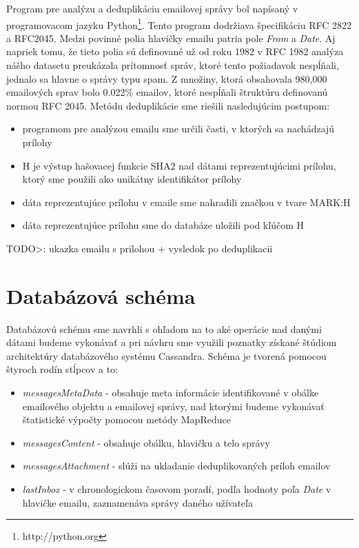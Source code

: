 \documentclass[11pt,twoside,a4paper]{book}
\begin{document}
Program pre analýzu a deduplikáciu emailovej správy bol napísaný v programovacom jazyku Python\footnote{http://python.org}. Tento program dodržiava špecifikáciu RFC 2822 a RFC2045. 
Medzi povinné polia hlavičky emailu patria pole \emph{From} a \emph{Date}. Aj napriek tomu, že tieto polia sú definované už od roku 1982 v RFC 1982 analýza nášho datasetu preukázala prítomnosť správ, ktoré tento požiadavok nespĺňali, jednalo sa hlavne o správy typu spam. Z množiny, ktorá obsahovala 980,000 emailových sprav bolo 0.022\% emailov, ktoré nespĺňali štruktúru definovanú normou RFC 2045. Metódu deduplikácie sme riešili nasledujúcim postupom:

\begin{itemize}
 \item programom pre analýzou emailu sme určili časti, v ktorých sa nachádzajú prílohy
 \item H je výstup hašovacej funkcie SHA2 nad dátami reprezentujúcimi prílohu, ktorý sme použili ako unikátny identifikátor prílohy
 \item dáta reprezentujúce prílohu v emaile sme nahradili značkou v tvare MARK:H
 \item dáta reprezentujúce prílohu sme do databáze uložili pod kľúčom H
\end{itemize}


TODO>:
ukazka emailu s prilohou + vysledok po deduplikacii
\section{Databázová schéma}

Databázovú schému sme navrhli s ohľadom na to aké operácie nad danými dátami budeme vykonávať a pri návhru sme využili poznatky získané štúdiom architektúry databázového systému Cassandra. Schéma je tvorená pomocou štyroch rodín stĺpcov a to:

\begin{itemize}
 \item \emph{messagesMetaData} - obsahuje meta informácie identifikované v obálke emailového objektu a emailovej správy, nad ktorými budeme vykonávať štatistické výpočty pomocou metódy MapReduce
 \item \emph{messagesContent} - obsahuje obálku, hlavičku a telo správy
 \item \emph{messagesAttachment} - slúži na ukladanie deduplikovaných príloh emailov  
 \item \emph{lastInbox} - v chronologickom časovom poradí, podľa hodnoty poľa \emph{Date} v hlavičke emailu, zaznamenáva správy daného užívateľa
\end{itemize}
\end{document}
